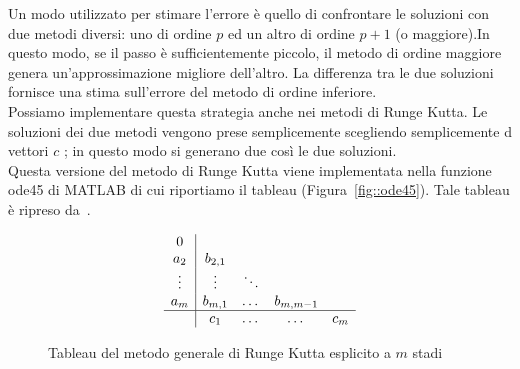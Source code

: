 Un modo utilizzato  per stimare l'errore  \`e quello di confrontare le soluzioni con  due metodi diversi: uno di ordine $p$ ed un altro di ordine $p+1$ (o maggiore).In questo modo, se il passo \`e sufficientemente piccolo,  il metodo di ordine maggiore genera un'approssimazione migliore dell'altro.  La differenza tra le due soluzioni fornisce una stima sull'errore del metodo di ordine inferiore.\\
Possiamo implementare questa strategia anche nei metodi di Runge Kutta.  Le soluzioni dei due metodi vengono prese semplicemente scegliendo semplicemente d vettori $c$ ; in questo modo si generano due cos\`i le due soluzioni.\\
Questa versione del metodo di Runge Kutta viene implementata nella funzione ode45 di MATLAB di cui riportiamo il tableau (Figura~\ref{fig::ode45}). Tale tableau \`e ripreso da~\cite{ode_matlab}.
\begin{figure}[!htb]
$$\begin{array}{c|cccc}
 0 & \\
 
 a_2 	& b_{2,1}	& 			& 			& 	\\
 \vdots & \vdots 	& \ddots 	&			&	\\
  a_m 	& b_{m,1}	& \dots		& b_{m,m-1}	&	\\
  \hline
		& c_1 		& \dots 	& \dots 	&c_m
\end{array}$$
	\caption{Tableau del metodo generale di Runge Kutta esplicito a $m$ stadi}	
	\label{fig::tableau}
\end{figure}
